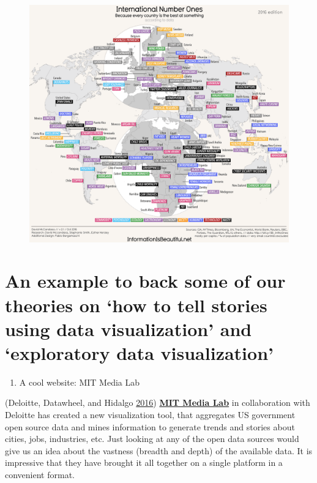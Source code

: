 \documentclass[]{book}
\providecommand{\tightlist}{%
  \setlength{\itemsep}{0pt}\setlength{\parskip}{0pt}}
\theoremstyle{definition}
\theoremstyle{definition}
\theoremstyle{definition}
\theoremstyle{remark}
\begin{document}
\begin{figure}
\centering
\includegraphics{images/Number_ones.png}
\caption{}
\end{figure}

\section{\texorpdfstring{An example to back some of our theories on `how
to tell stories using data visualization' and `exploratory data
visualization'}{An example to back some of our theories on how to tell stories using data visualization and exploratory data visualization}}\label{an-example-to-back-some-of-our-theories-on-how-to-tell-stories-using-data-visualization-and-exploratory-data-visualization}

\begin{enumerate}
\def\labelenumi{\arabic{enumi}.}
\tightlist
\item
  A cool website: MIT Media Lab
\end{enumerate}

(Deloitte, Datawheel, and Hidalgo \protect\hyperlink{ref-DataUSA}{2016})
\href{https://www.media.mit.edu}{\textbf{MIT Media Lab}} in
collaboration with Deloitte has created a new visualization tool, that
aggregates US government open source data and mines information to
generate trends and stories about cities, jobs, industries, etc. Just
looking at any of the open data sources would give us an idea about the
vastness (breadth and depth) of the available data. It is impressive
that they have brought it all together on a single platform in a
convenient format.
\end{document}
